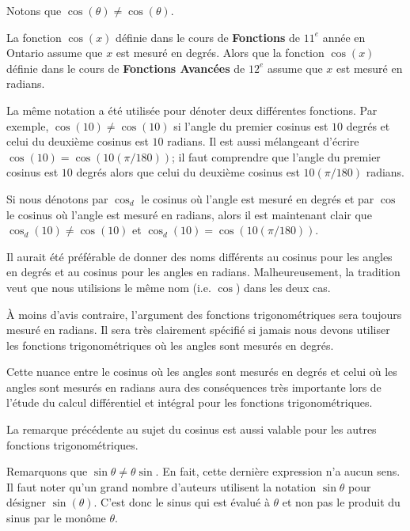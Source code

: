 {\begin{rmk}
Notons que  $\cos(\theta) \neq \cos(\theta)$.

La fonction $\cos(x)$ définie dans le cours de
{\bfseries Fonctions} de $11^e$ année en Ontario assume
que $x$ est mesuré en degrés.  Alors que la fonction $\cos(x)$
définie dans le cours de {\bfseries Fonctions Avancées} de $12^e$
assume que $x$ est mesuré en radians.

La même notation a été utilisée pour dénoter deux différentes
fonctions.  Par exemple, $\cos(10) \neq \cos(10)$ si l'angle du
premier cosinus est $10$ degrés et celui du deuxième cosinus est $10$
radians.  Il est aussi mélangeant d'écrire $\displaystyle \cos(10) =
\cos\left( 10 (\pi/180)\right)$; il faut comprendre que
l'angle du premier cosinus est $10$ degrés alors que celui du deuxième
cosinus est $\displaystyle 10 (\pi/180)$ radians.

Si nous dénotons par $\cos_{d}$ le cosinus où l'angle est mesuré en
degrés et par $\cos$ le cosinus où l'angle est mesuré en radians,
alors il est maintenant clair que $\cos_{d}(10) \neq \cos(10)$ et
$\displaystyle \cos_{d}(10) = \cos\left( 10 (\pi/180) \right)$.

Il aurait été préférable de donner des noms différents au cosinus pour
les angles en degrés et au cosinus pour les angles en radians.
Malheureusement, la tradition veut que nous utilisions le même nom
(i.e. $\cos$) dans les deux cas.

À moins d'avis contraire, l'argument des fonctions trigonométriques
sera toujours mesuré en radians.  Il sera très clairement spécifié si
jamais nous devons utiliser les fonctions trigonométriques où les angles
sont mesurés en degrés.

Cette nuance entre le cosinus où les angles sont mesurés en degrés et
celui où les angles sont mesurés en radians aura des conséquences très
importante lors de l'étude du calcul différentiel et intégral pour les
fonctions trigonométriques.

La remarque précédente au sujet du cosinus est aussi valable pour les
autres fonctions trigonométriques.
\end{rmk}

\begin{rmk}
Remarquons que $\sin \theta \neq \theta \sin$.  En fait, cette
dernière expression n'a aucun sens.  Il faut noter qu'un grand nombre
d'auteurs utilisent la notation  $\sin \theta$ pour désigner
$\sin(\theta)$.  C'est donc le sinus qui est évalué à $\theta$ et non
pas le produit du sinus par le monôme $\theta$.


\end{rmk}}
